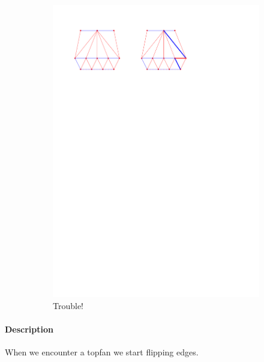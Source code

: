 \begin{figure}
\begin{subfigure}[b]{0.45 \textwidth}
    \end{subfigure}
    ~
    \begin{subfigure}[b]{0.45 \textwidth}
        \includegraphics[width =\textwidth]{topFanFlips/img/splitfront}
        \caption{Trouble!}
        \label{fig:fanflip:splitFirstVertex}

    \end{subfigure}

    \caption{}
    \label{fig:fanflip:fanflips}
\end{figure}


\paragraph{Description}

When we encounter a topfan we start flipping edges.

